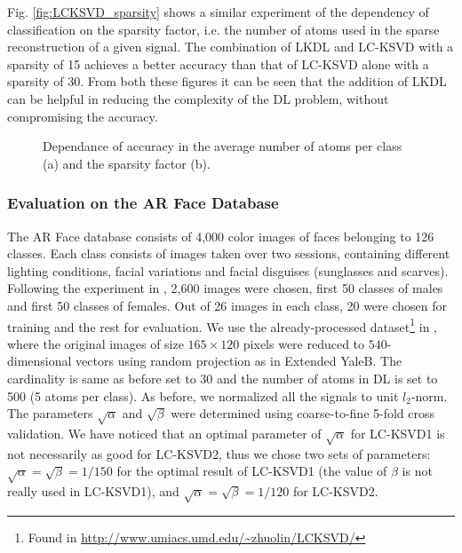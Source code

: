\documentclass[journal]{IEEEtran}
\begin{document}
Fig. \ref{fig:LCKSVD_sparsity} shows a similar experiment of the dependency of classification on the sparsity factor, i.e. the number of atoms used in the sparse reconstruction of a given signal. The combination of LKDL and LC-KSVD with a sparsity of 15 achieves a better accuracy than that of LC-KSVD alone with a sparsity of 30. From both these figures it can be seen that the addition of LKDL can be helpful in reducing the complexity of the DL problem, without compromising the accuracy.

\begin{figure*}[!t]
\centering
{}
\hfil
{}
\caption{Dependance of accuracy in the average number of atoms per class (a) and the sparsity factor (b).}
\label{fig:GRAPH_5}
\end{figure*}

\subsubsection{Evaluation on the AR Face Database}

The AR Face database consists of 4,000 color images of faces belonging to 126 classes. Each class consists of images taken over two sessions, containing different lighting conditions, facial variations and facial disguises (sunglasses and scarves). Following the experiment in \cite{LCKSVD2}, 2,600 images were chosen, first 50 classes of males and first 50 classes of females. Out of 26 images in each class, 20 were chosen for training and the rest for evaluation. We use the already-processed dataset\footnote{Found in \url{http://www.umiacs.umd.edu/~zhuolin/LCKSVD/}} in \cite{LCKSVD2}, where the original images of size $165 \times 120$ pixels were reduced to $540$-dimensional vectors using random projection as in Extended YaleB. The cardinality is same as before set to 30 and the number of atoms in DL is set to 500 (5 atoms per class). As before, we normalized all the signals to unit $l_2$-norm. The parameters $\sqrt{\alpha}$ and $\sqrt{\beta}$ were determined using coarse-to-fine 5-fold cross validation. We have noticed that an optimal parameter of $\sqrt{\alpha}$ for LC-KSVD1 is not necessarily as good for LC-KSVD2, thus we chose two sets of parameters: $\sqrt{\alpha}=\sqrt{\beta}=1/150$ for the optimal result of LC-KSVD1 (the value of $\beta$ is not really used in LC-KSVD1), and $\sqrt{\alpha}=\sqrt{\beta}=1/120$ for LC-KSVD2.
\end{document}
